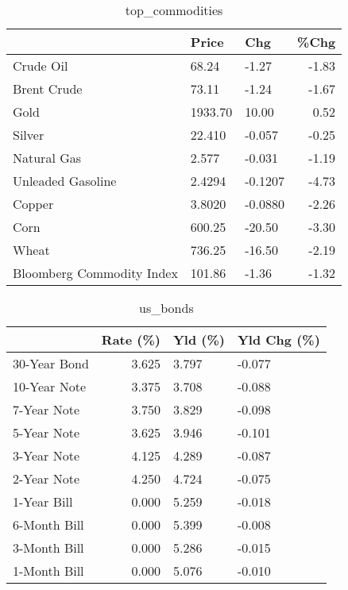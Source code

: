 \documentclass{article}%
\begin{document}
\begin{table}[htbp]%
\caption{top\_commodities}%
\centering%
\begin{adjustbox}{width=1\textwidth}%
\begin{tabular}{lllr}
\toprule
                          &   Price &     Chg &  \%Chg \\
\midrule
               Crude Oil  &   68.24 &   -1.27 & -1.83 \\
             Brent Crude  &   73.11 &   -1.24 & -1.67 \\
                    Gold  & 1933.70 &   10.00 &  0.52 \\
                  Silver  &  22.410 &  -0.057 & -0.25 \\
             Natural Gas  &   2.577 &  -0.031 & -1.19 \\
       Unleaded Gasoline  &  2.4294 & -0.1207 & -4.73 \\
                  Copper  &  3.8020 & -0.0880 & -2.26 \\
                    Corn  &  600.25 &  -20.50 & -3.30 \\
                   Wheat  &  736.25 &  -16.50 & -2.19 \\
Bloomberg Commodity Index &  101.86 &   -1.36 & -1.32 \\
\bottomrule
\end{tabular}
%
\end{adjustbox}%
\end{table}

%


\begin{table}[htbp]%
\caption{us\_bonds}%
\centering%
\begin{adjustbox}{width=1\textwidth}%
\begin{tabular}{lrll}
\toprule
             &  Rate (\%) & Yld (\%) & Yld Chg (\%) \\
\midrule
30-Year Bond &     3.625 &   3.797 &      -0.077 \\
10-Year Note &     3.375 &   3.708 &      -0.088 \\
 7-Year Note &     3.750 &   3.829 &      -0.098 \\
 5-Year Note &     3.625 &   3.946 &      -0.101 \\
 3-Year Note &     4.125 &   4.289 &      -0.087 \\
 2-Year Note &     4.250 &   4.724 &      -0.075 \\
 1-Year Bill &     0.000 &   5.259 &      -0.018 \\
6-Month Bill &     0.000 &   5.399 &      -0.008 \\
3-Month Bill &     0.000 &   5.286 &      -0.015 \\
1-Month Bill &     0.000 &   5.076 &      -0.010 \\
\bottomrule
\end{tabular}
%
\end{adjustbox}%
\end{table}
\end{document}
